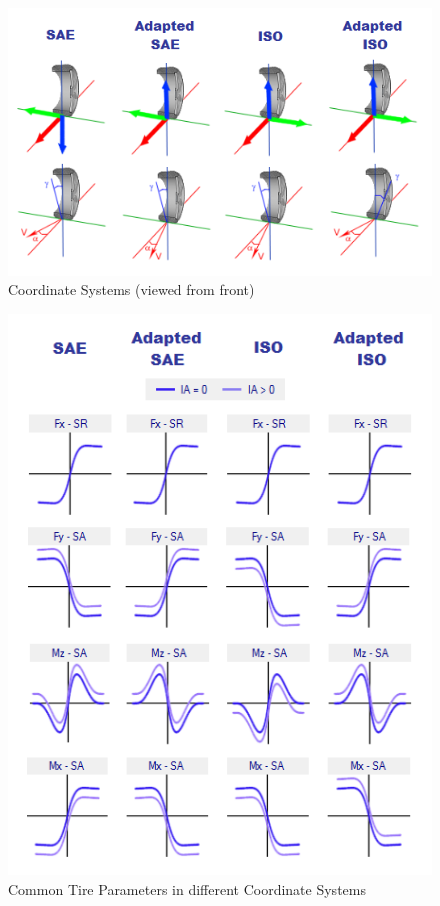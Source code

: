 \begin{figure}[H]
	\centering
		\includegraphics[width=1.0\textwidth]{CoordinateSystems.png}
	\caption{Coordinate Systems (viewed from front)}
	\label{fig:CoordinateSystems}
\end{figure}

\begin{figure}[H]
	\centering
		\includegraphics[width=1.0\textwidth]{ExampleCoordGraphs.png}
	\caption{Common Tire Parameters in different Coordinate Systems}
	\label{fig:ExampleCoordGraphs}
\end{figure}

